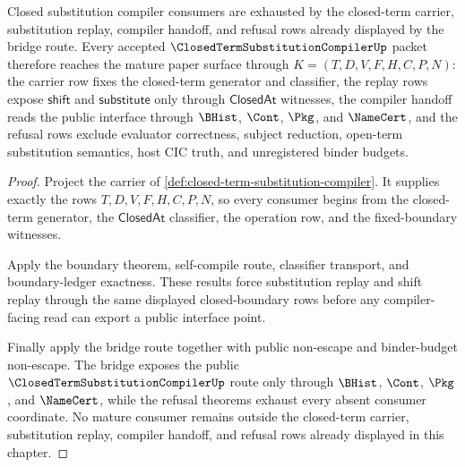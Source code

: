 \begin{theorem}
\label{thm:closed-term-substitution-compiler-mature-route}
Closed substitution compiler consumers are exhausted by the closed-term carrier, substitution replay, compiler handoff, and refusal rows already displayed by the bridge route. Every accepted $\ClosedTermSubstitutionCompilerUp$ packet therefore reaches the mature paper surface through $K=(T,D,V,F,H,C,P,N)$: the carrier row fixes the closed-term generator and classifier, the replay rows expose $\mathsf{shift}$ and $\mathsf{substitute}$ only through $\mathsf{ClosedAt}$ witnesses, the compiler handoff reads the public interface through $\BHist$, $\Cont$, $\Pkg$, and $\NameCert$, and the refusal rows exclude evaluator correctness, subject reduction, open-term substitution semantics, host CIC truth, and unregistered binder budgets.
\end{theorem}
\begin{proof}
Project the carrier of \autoref{def:closed-term-substitution-compiler}. It supplies exactly the rows $T,D,V,F,H,C,P,N$, so every consumer begins from the closed-term generator, the $\mathsf{ClosedAt}$ classifier, the operation row, and the fixed-boundary witnesses.

Apply the boundary theorem, self-compile route, classifier transport, and boundary-ledger exactness. These results force substitution replay and shift replay through the same displayed closed-boundary rows before any compiler-facing read can export a public interface point.

Finally apply the bridge route together with public non-escape and binder-budget non-escape. The bridge exposes the public $\ClosedTermSubstitutionCompilerUp$ route only through $\BHist$, $\Cont$, $\Pkg$, and $\NameCert$, while the refusal theorems exhaust every absent consumer coordinate. No mature consumer remains outside the closed-term carrier, substitution replay, compiler handoff, and refusal rows already displayed in this chapter.
\end{proof}


